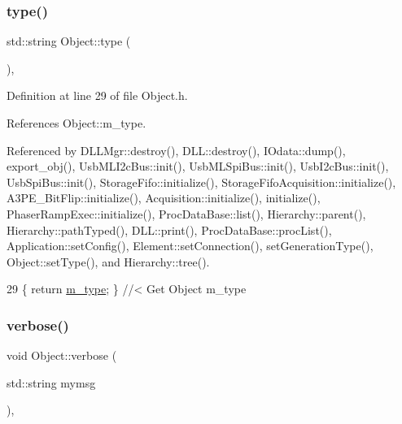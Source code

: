 \subsubsection{\texorpdfstring{type()}{type()}}
{\footnotesize\ttfamily std\+::string Object\+::type (\begin{DoxyParamCaption}{ }\end{DoxyParamCaption})\hspace{0.3cm}{\ttfamily [inline]}, {\ttfamily [inherited]}}



Definition at line 29 of file Object.\+h.



References Object\+::m\+\_\+type.



Referenced by D\+L\+L\+Mgr\+::destroy(), D\+L\+L\+::destroy(), I\+Odata\+::dump(), export\+\_\+obj(), Usb\+M\+L\+I2c\+Bus\+::init(), Usb\+M\+L\+Spi\+Bus\+::init(), Usb\+I2c\+Bus\+::init(), Usb\+Spi\+Bus\+::init(), Storage\+Fifo\+::initialize(), Storage\+Fifo\+Acquisition\+::initialize(), A3\+P\+E\+\_\+\+Bit\+Flip\+::initialize(), Acquisition\+::initialize(), initialize(), Phaser\+Ramp\+Exec\+::initialize(), Proc\+Data\+Base\+::list(), Hierarchy\+::parent(), Hierarchy\+::path\+Typed(), D\+L\+L\+::print(), Proc\+Data\+Base\+::proc\+List(), Application\+::set\+Config(), Element\+::set\+Connection(), set\+Generation\+Type(), Object\+::set\+Type(), and Hierarchy\+::tree().


\begin{DoxyCode}
29 \{ \textcolor{keywordflow}{return} \hyperlink{classObject_a457a600fe8c00eb1034374f75110a78c}{m\_type};       \} \textcolor{comment}{//< Get Object m\_type}
\end{DoxyCode}
\mbox{\label{classObject_a83d2db2df682907ea1115ad721c1c4a1}} 
\subsubsection{\texorpdfstring{verbose()}{verbose()}\hspace{0.1cm}{\footnotesize\ttfamily [1/2]}}
{\footnotesize\ttfamily void Object\+::verbose (\begin{DoxyParamCaption}\item[{std\+::string}]{mymsg }\end{DoxyParamCaption})\hspace{0.3cm}{\ttfamily [inline]}, {\ttfamily [inherited]}}



